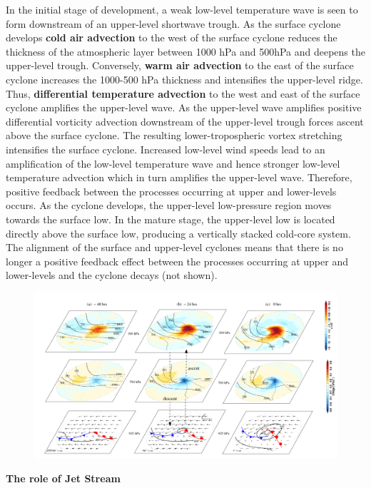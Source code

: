 \documentclass[12pt,oneside]{book}
\begin{document}
In the initial stage of development, a weak low-level temperature wave
is seen to form downstream of an upper-level shortwave trough. As the
surface cyclone develops \textbf{cold air advection} to the west of the
surface cyclone reduces the thickness of the atmospheric layer between
1000 hPa and 500hPa and deepens the upper-level trough. Conversely,
\textbf{warm air advection} to the east of the surface cyclone increases
the 1000-500 hPa thickness and intensifies the upper-level ridge. Thus,
\textbf{differential temperature advection} to the west and east of the
surface cyclone amplifies the upper-level wave. As the upper-level wave
amplifies positive differential vorticity advection downstream of the
upper-level trough forces ascent above the surface cyclone. The
resulting lower-tropospheric vortex stretching intensifies the surface
cyclone. Increased low-level wind speeds lead to an amplification of the
low-level temperature wave and hence stronger low-level temperature
advection which in turn amplifies the upper-level wave. Therefore,
positive feedback between the processes occurring at upper and
lower-levels occurs. As the cyclone develops, the upper-level
low-pressure region moves towards the surface low. In the mature stage,
the upper-level low is located directly above the surface low, producing
a vertically stacked cold-core system. The alignment of the surface and
upper-level cyclones means that there is no longer a positive feedback
effect between the processes occurring at upper and lower-levels and the
cyclone decays (not shown).

\begin{figure}

{\centering \includegraphics[width=0.8\linewidth]{figures/Figure633b} 

}

\caption{ }\label{fig:Fig633b}
\end{figure}

\textbf{The role of Jet Stream}
\end{document}
